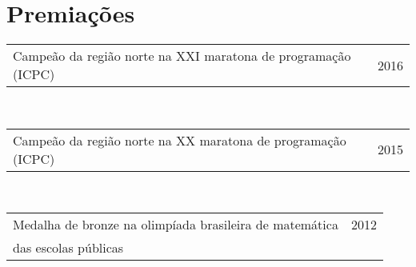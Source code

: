 \section{Premiações}

\begin{tabular}{p{11cm}|r}
  Campeão da região norte na XXI maratona de programação (ICPC) & \textsc{2016} \\
\end{tabular}\\

\begin{tabular}{p{11cm}|r}
  Campeão da região norte na XX maratona de programação (ICPC) & \textsc{2015} \\
\end{tabular}\\

\begin{tabular}{p{11cm}|r}
  Medalha de bronze na olimpíada brasileira de matemática & \textsc{2012} \\
  das escolas públicas &  \\
\end{tabular}\\
